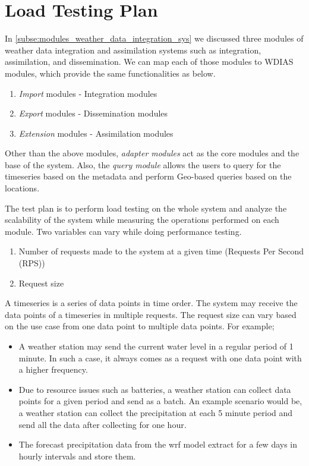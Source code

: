 \section{Load Testing Plan}
\label{se:test_plan}

In \cref{subse:modules_weather_data_integration_sys} we discussed three modules of weather data integration and assimilation systems such as integration, assimilation, and dissemination. We can map each of those modules to WDIAS modules, which provide the same functionalities as below.
\begin{enumerate}
    \item \emph{Import} modules - Integration modules
    \item \emph{Export} modules - Dissemination modules
    \item \emph{Extension} modules - Assimilation modules
\end{enumerate}

Other than the above modules, \emph{adapter modules} act as the core modules and the base of the system. Also, the \emph{query module} allows the users to query for the timeseries based on the metadata and perform Geo-based queries based on the locations.

The test plan is to perform load testing on the whole system and analyze the scalability of the system while measuring the operations performed on each module. Two variables can vary while doing performance testing.
\begin{enumerate}
    \item Number of requests made to the system at a given time (Requests Per Second (RPS))
    \item Request size
\end{enumerate}

A timeseries is a series of data points in time order. The system may receive the data points of a timeseries in multiple requests. The request size can vary based on the use case from one data point to multiple data points. For example;
\begin{itemize}
    \item A weather station may send the current water level in a regular period of 1 minute. In such a case, it always comes as a request with one data point with a higher frequency.
    \item Due to resource issues such as batteries, a weather station can collect data points for a given period and send as a batch. An example scenario would be, a weather station can collect the precipitation at each 5 minute period and send all the data after collecting for one hour.
    \item The forecast precipitation data from the \acrshort{wrf} model extract for a few days in hourly intervals and store them.
\end{itemize}

